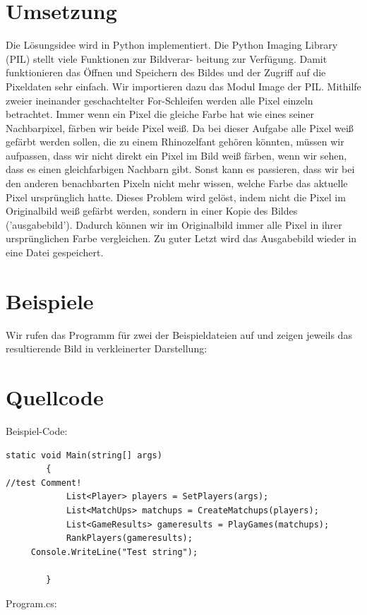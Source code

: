 \documentclass[a4paper,10pt,ngerman]{scrartcl}
\begin{document}
\section{Umsetzung}
Die Lösungsidee wird in Python implementiert. Die Python Imaging Library (PIL) stellt viele Funktionen zur Bildverar- beitung zur Verfügung. Damit funktionieren das Öffnen und 
Speichern des Bildes und der Zugriff auf die Pixeldaten sehr einfach. Wir importieren dazu das Modul Image der PIL. Mithilfe zweier ineinander geschachtelter For-Schleifen 
werden alle Pixel einzeln betrachtet. Immer wenn ein Pixel die gleiche Farbe hat wie eines seiner Nachbarpixel, färben wir beide Pixel weiß. Da bei dieser Aufgabe alle Pixel weiß gefärbt werden sollen, die zu einem Rhinozelfant gehören könnten, müssen wir aufpassen, dass wir nicht direkt ein Pixel im Bild weiß färben, wenn wir sehen, dass es einen gleichfarbigen Nachbarn 
gibt. Sonst kann es passieren, dass wir bei den anderen benachbarten Pixeln nicht mehr wissen, welche Farbe das aktuelle Pixel ursprünglich hatte. Dieses Problem wird 
gelöst, indem nicht die Pixel im Originalbild weiß gefärbt werden, sondern in einer Kopie des Bildes ('ausgabebild'). Dadurch können wir im Originalbild immer alle Pixel in ihrer 
ursprünglichen Farbe vergleichen. Zu guter Letzt wird das Ausgabebild wieder in eine Datei 
gespeichert. 
\section{Beispiele}
Wir rufen das Programm für zwei der Beispieldateien auf und zeigen jeweils das resultierende Bild in verkleinerter Darstellung: 
\section{Quellcode}
Beispiel-Code:
\begin{lstlisting}
static void Main(string[] args)
        {
//test Comment!
            List<Player> players = SetPlayers(args);
            List<MatchUps> matchups = CreateMatchups(players);
            List<GameResults> gameresults = PlayGames(matchups);
            RankPlayers(gameresults);
	 Console.WriteLine("Test string");
            
        }
\end{lstlisting}
Program.cs:

\end{document}
